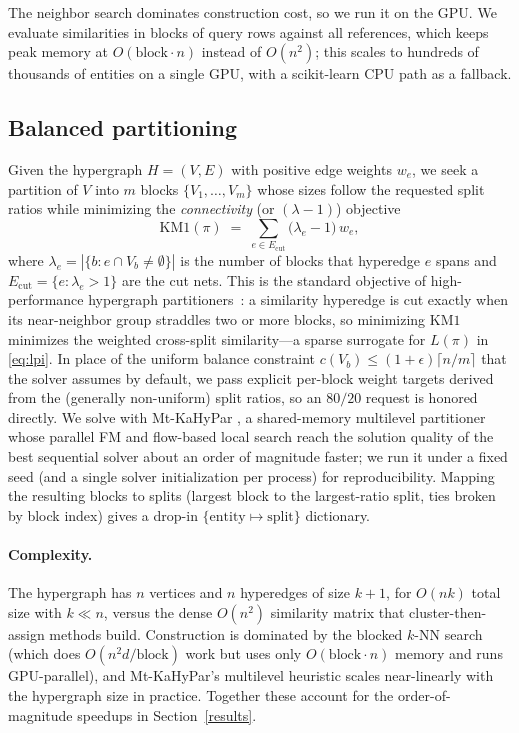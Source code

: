 \documentclass{article}
\begin{document}
The neighbor search dominates construction cost, so we run it on the GPU. We
evaluate similarities in blocks of query rows against all references, which keeps
peak memory at $O(\text{block}\cdot n)$ instead of $O(n^2)$; this scales to
hundreds of thousands of entities on a single GPU, with a scikit-learn CPU path
as a fallback.

\subsection{Balanced partitioning}
\label{sec:partition}
Given the hypergraph $H=(V,E)$ with positive edge weights $w_e$, we seek a
partition of $V$ into $m$ blocks $\{V_1,\dots,V_m\}$ whose sizes follow the
requested split ratios while minimizing the \emph{connectivity} (or
$(\lambda{-}1)$) objective
\begin{equation}
    \label{eq:km1}
    \mathrm{KM1}(\pi) \;=\; \sum_{e\in E_{\mathrm{cut}}} \big(\lambda_e - 1\big)\, w_e,
\end{equation}
where $\lambda_e=|\{b : e \cap V_b \neq \emptyset\}|$ is the number of blocks that
hyperedge $e$ spans and $E_{\mathrm{cut}}=\{e:\lambda_e>1\}$ are the cut nets. This
is the standard objective of high-performance hypergraph
partitioners~\cite{gottesburen2023}: a similarity hyperedge is cut exactly when
its near-neighbor group straddles two or more blocks, so minimizing
$\mathrm{KM1}$ minimizes the weighted cross-split similarity---a sparse surrogate
for $L(\pi)$ in \eqref{eq:lpi}. In place of the uniform balance constraint
$c(V_b)\le(1{+}\epsilon)\lceil n/m\rceil$ that the solver assumes by default, we
pass explicit per-block weight targets derived from the (generally non-uniform)
split ratios, so an $80/20$ request is honored directly. We solve with Mt-KaHyPar
\cite{gottesburen2023}, a shared-memory multilevel partitioner whose parallel FM
and flow-based local search reach the solution quality of the best sequential
solver about an order of magnitude faster; we run it under a fixed seed (and a
single solver initialization per process) for reproducibility. Mapping the
resulting blocks to splits (largest block to the largest-ratio split, ties broken
by block index) gives a drop-in $\{\text{entity} \mapsto \text{split}\}$
dictionary.

\paragraph{Complexity.} The hypergraph has $n$ vertices and $n$ hyperedges of
size $k{+}1$, for $O(nk)$ total size with $k \ll n$, versus the dense
$O(n^2)$ similarity matrix that cluster-then-assign methods build. Construction
is dominated by the blocked $k$-NN search (which does $O(n^2 d / \text{block})$
work but uses only $O(\text{block}\cdot n)$ memory and runs GPU-parallel), and
Mt-KaHyPar's multilevel heuristic scales near-linearly with the hypergraph
size in practice. Together these account for the order-of-magnitude speedups in
Section~\ref{results}.
\end{document}
